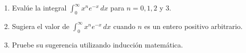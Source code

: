 \item 
    \begin{enumerate}
        \item[(a)] Evalúe la integral $\int_{0}^{\infty} x^n e^{-x} \, dx$ para $n = 0, 1, 2$ y $3$.
        \item[(b)] Sugiera el valor de $\int_{0}^{\infty} x^n e^{-x} \, dx$ cuando $n$ es un entero positivo arbitrario.
        \item[(c)] Pruebe su sugerencia utilizando inducción matemática.
    \end{enumerate}
